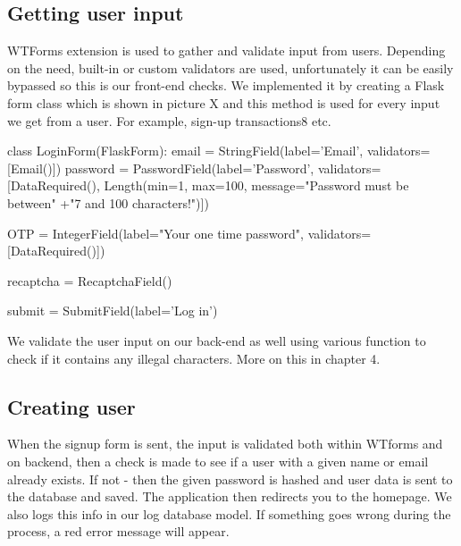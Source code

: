 \subsection{Getting user input}

WTForms extension is used to gather and validate input from users. Depending on the need, built-in or custom validators are used, unfortunately it can be easily bypassed so this is our front-end checks. We implemented it by  creating a Flask form class which is shown in picture X and this method is used for every input we get from a user. For example, sign-up transactions8 etc. 

\begin{python}
class LoginForm(FlaskForm):
   email = StringField(label='Email', validators=[Email()])
   password = PasswordField(label='Password',
                            validators=[DataRequired(),
                            Length(min=1, max=100,
                            message="Password must be between"
                           +"7 and 100 characters!")])
   
   OTP = IntegerField(label="Your one time password",
                      validators=[DataRequired()])

   recaptcha = RecaptchaField()

   submit = SubmitField(label='Log in')
\end{python}

We validate the user input on our back-end as well using various function to check if it contains any illegal characters. More on this in chapter 4.  %

\subsection{Creating user}

When the signup form is sent, the input is validated both within WTforms and on backend, then a check is made to see if a user with a given name or email already exists. If not - then the given password is hashed and user data is sent to the database and saved. The application then redirects you to the homepage. We also logs this info in our log database model. If something goes wrong during the process, a red error message will appear.

